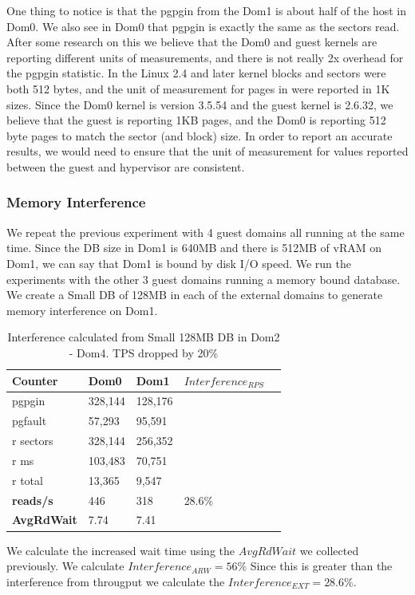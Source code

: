 One thing to notice is that the pgpgin from the Dom1 is about half of the host in Dom0.  
We also see in Dom0 that pgpgin is exactly the same as the sectors read.  
After some research on this we believe that the Dom0 and guest kernels are reporting different units of measurements, and there is not really 2x overhead for the pgpgin statistic.  
In the Linux 2.4 and later kernel blocks and sectors were both 512 bytes, and the unit of measurement for pages in were reported in 1K sizes.  Since the Dom0 kernel is version 3.5.54 and the guest kernel is 2.6.32, we believe that the guest is reporting 1KB pages, and the Dom0 is reporting 512 byte pages to match the sector (and block) size.  In order to report an accurate results, we would need to ensure that the unit of measurement for values reported between the guest and hypervisor are consistent.  

\subsubsection{Memory Interference}
We repeat the previous experiment with 4 guest domains all running at the same time.  Since the DB size in Dom1 is 640MB and there is 512MB of vRAM on Dom1, we can say that Dom1 is bound by disk I/O speed.  We run the experiments with the other 3 guest domains running a memory bound database.  
We create a Small DB of 128MB in each of the external domains to generate memory interference on Dom1.

\begin{table}[h]
\begin{tabular}{ l l l l p{5cm} }
  Counter & Dom0 & Dom1 & $Interference_{RPS}$ \\
  \hline
	pgpgin    & 328,144 & 128,176 &  \\
	pgfault   &  57,293 &  95,591 &  \\
	r sectors & 328,144 & 256,352 &  \\
	r ms      & 103,483 &  70,751 &  \\
	r total   &  13,365 &   9,547 &  \\
    \textbf{reads/s}    & 446 & 318 & 28.6\%  \\
    \textbf{AvgRdWait}  & 7.74 & 7.41 & \\ 
  \hline
\end{tabular}
\caption{Interference calculated from Small 128MB DB in Dom2 - Dom4.  TPS dropped by 20\%} 
\label{fig:InterferenceSm}
\end{table}
We calculate the increased wait time using the $AvgRdWait$ we collected previously. We calculate $Interference_{ARW} = 56\%$  Since this is greater than the interference from througput we calculate the $Interference_{EXT} = 28.6\%$.

